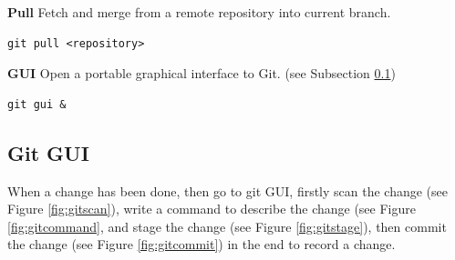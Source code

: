 \documentclass[11pt]{report}
\begin{document}
\textbf{Pull} Fetch and merge from a remote repository into current branch.
\begin{verbatim}
git pull <repository>
\end{verbatim}

\textbf{GUI} Open a portable graphical interface to Git. (see Subsection \ref{sec:gui})
\begin{verbatim}
git gui &
\end{verbatim}


\subsection{Git GUI}
\label{sec:gui}
When a change has been done, then go to git GUI, firstly scan the change (see Figure \ref{fig:gitscan}), write a command to describe the change (see Figure \ref{fig:gitcommand}, and stage the change (see Figure \ref{fig:gitstage}), then commit the change (see Figure \ref{fig:gitcommit}) in the end to record a change.
\end{document}
